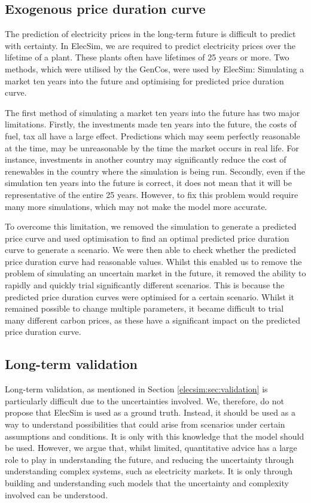 \subsection{Exogenous price duration curve}

The prediction of electricity prices in the long-term future is difficult to predict with certainty. In ElecSim, we are required to predict electricity prices over the lifetime of a plant. These plants often have lifetimes of 25 years or more. Two methods, which were utilised by the GenCos, were used by ElecSim: Simulating a market ten years into the future and optimising for predicted price duration curve.

The first method of simulating a market ten years into the future has two major limitations. Firstly, the investments made ten years into the future, the costs of fuel, tax all have a large effect. Predictions which may seem perfectly reasonable at the time, may be unreasonable by the time the market occurs in real life. For instance, investments in another country may significantly reduce the cost of renewables in the country where the simulation is being run. Secondly, even if the simulation ten years into the future is correct, it does not mean that it will be representative of the entire 25 years. However, to fix this problem would require many more simulations, which may not make the model more accurate.

To overcome this limitation, we removed the simulation to generate a predicted price curve and used optimisation to find an optimal predicted price duration curve to generate a scenario. We were then able to check whether the predicted price duration curve had reasonable values. Whilst this enabled us to remove the problem of simulating an uncertain market in the future, it removed the ability to rapidly and quickly trial significantly different scenarios. This is because the predicted price duration curves were optimised for a certain scenario. Whilst it remained possible to change multiple parameters, it became difficult to trial many different carbon prices, as these have a significant impact on the predicted price duration curve.


\subsection{Long-term validation}

Long-term validation, as mentioned in Section \ref{elecsim:sec:validation} is particularly difficult due to the uncertainties involved. We, therefore, do not propose that ElecSim is used as a ground truth. Instead, it should be used as a way to understand possibilities that could arise from scenarios under certain assumptions and conditions. It is only with this knowledge that the model should be used. However, we argue that, whilst limited, quantitative advice has a large role to play in understanding the future, and reducing the uncertainty through understanding complex systems, such as electricity markets. It is only through building and understanding such models that the uncertainty and complexity involved can be understood. 

